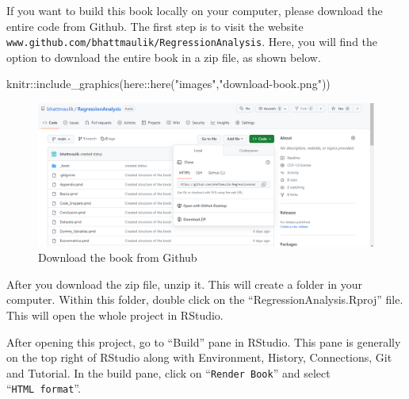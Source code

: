 \documentclass[
  letterpaper,
  paper =a4,
  twoside,
  openright,
  headsepline,
  footsepline,
  listof = totocnumbered,
  chapterprefix = true,
  firstiscover]{scrbook}
\newenvironment{Shaded}{\begin{snugshade}}{\end{snugshade}}
\newcommand{\FunctionTok}[1]{\textcolor[rgb]{0.28,0.35,0.67}{#1}}
\newcommand{\NormalTok}[1]{\textcolor[rgb]{0.00,0.23,0.31}{#1}}
\newcommand{\SpecialCharTok}[1]{\textcolor[rgb]{0.37,0.37,0.37}{#1}}
\newcommand{\StringTok}[1]{\textcolor[rgb]{0.13,0.47,0.30}{#1}}
\begin{document}

\setcounter{figure}{0}
\renewcommand{\thefigure}{C.\arabic{figure}}
\setcounter{table}{0}
\renewcommand{\thetable}{C.\arabic{table}}

If you want to build this book locally on your computer, please download
the entire code from Github. The first step is to visit the website
\texttt{www.github.com/bhattmaulik/RegressionAnalysis}. Here, you will
find the option to download the entire book in a zip file, as shown
below.

\begin{Shaded}
\begin{Highlighting}[numbers=left,,]
\NormalTok{knitr}\SpecialCharTok{::}\FunctionTok{include\_graphics}\NormalTok{(here}\SpecialCharTok{::}\FunctionTok{here}\NormalTok{(}\StringTok{"images"}\NormalTok{,}\StringTok{"download{-}book.png"}\NormalTok{))}
\end{Highlighting}
\end{Shaded}

\begin{figure}[H]

{\centering \includegraphics[width=4.43in,height=\textheight]{images/download-book.png}

}

\caption{\label{fig-download-book}Download the book from Github}

\end{figure}

After you download the zip file, unzip it. This will create a folder in
your computer. Within this folder, double click on the
``RegressionAnalysis.Rproj'' file. This will open the whole project in
RStudio.

After opening this project, go to ``Build'' pane in RStudio. This pane
is generally on the top right of RStudio along with Environment,
History, Connections, Git and Tutorial. In the build pane, click on
``\texttt{Render\ Book}'' and select ``\texttt{HTML\ format}''.
\end{document}
